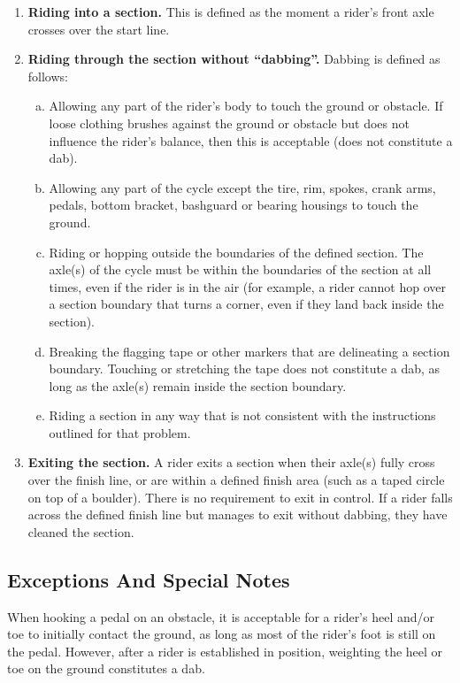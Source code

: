 \begin{enumerate}
\item \textbf{Riding into a section.} This is defined as the moment a rider's front axle crosses over the start line.
\item \textbf{Riding through the section without ``dabbing''.} Dabbing is defined as follows:
	\begin{enumerate}[a.]
	\item Allowing any part of the rider's body to touch the ground or obstacle. 
	If loose clothing brushes against the ground or obstacle but does not influence the rider's balance, then this is acceptable (does not constitute a dab).
	\item Allowing any part of the cycle except the tire, rim, spokes, crank arms, pedals, bottom bracket, bashguard or bearing housings to touch the ground.
	\item Riding or hopping outside the boundaries of the defined section.
	The axle(s) of the cycle must be within the boundaries of the section at all times, even if the rider is in the air (for example, a rider cannot hop over a section boundary that turns a corner, even if they land back inside the section).
	\item Breaking the flagging tape or other markers that are delineating a section boundary. 
	Touching or stretching the tape does not constitute a dab, as long as the axle(s) remain inside the section boundary.
	\item Riding a section in any way that is not consistent with the instructions outlined for that problem.
	\end{enumerate}
\item \textbf{Exiting the section.} A rider exits a section when their axle(s) fully cross over the finish line, or are within a
defined finish area (such as a taped circle on top of a boulder). 
There is no requirement to exit in control.
If a rider falls across the defined finish line but manages to exit without dabbing, they have cleaned the section.
\end{enumerate}

\subsection{Exceptions And Special Notes}
When hooking a pedal on an obstacle, it is acceptable for a rider's heel and/or toe to initially contact the ground, as long
as most of the rider's foot is still on the pedal. 
However, after a rider is established in position, weighting the heel or toe on the ground constitutes a dab.

